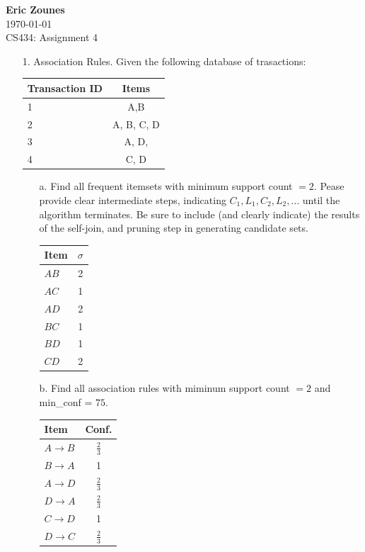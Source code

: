 \documentclass[12pt,letterpaper]{article}
\begin{document}
\setcounter{subsection}{2} 
\begin{flushright}
\end{flushright}
\begin{flushleft}
\textbf{Eric Zounes} \\
\today \\ 
CS434: Assignment 4
\end{flushleft}

\begin{enumerate} 
	\item[1.] Association Rules. Given the following database of trasactions: \\
	\begin{center}
	\begin{tabular}{| l | c |}   
		\hline
		Transaction ID & Items \\ \hline
		1 & A,B  \\ \hline
		2 & A, B, C, D  \\ \hline
		3 & A, D, \\ \hline
		4 & C, D \\ \hline 
	\end{tabular} 
	\end{center} 
	\begin{enumerate} 
		\item[a.] Find all frequent itemsets with minimum support count $= 2$. Pease provide clear intermediate steps, indicating $C_{1},L_{1},C_{2},L_{2}, \ldots$ until the algorithm terminates. Be sure to include (and clearly indicate) the results of the self-join, and pruning step in generating candidate sets. \\
	
		\begin{tabular}{| l | c |}   
		\hline
		Item & $\sigma$ \\ \hline
	   \cellcolor{green}$A B$ & 2  \\ \hline
		$A C$ & 1  \\ \hline
		\cellcolor{green}$A D$ & 2 \\ \hline
		$B C$ & 1 \\ \hline 
		$B D$ & 1 \\ \hline 
		\cellcolor{green}$C D$ & 2 \\ \hline 
		\end{tabular} 	
		
		\item[b.] Find all association rules with miminum support count $= 2$ and min\_conf = $75$.  \\
		\begin{tabular}{| l | c |}   
		\hline
		Item & Conf. \\ \hline
		$A \rightarrow B$ & $\frac{2}{3}$  \\ \hline
		\cellcolor{green}$B \rightarrow A$ & 1  \\ \hline
		$A \rightarrow D$ & $\frac{2}{3}$ \\ \hline
		$D \rightarrow A$ & $\frac{2}{3}$ \\ \hline 
		\cellcolor{green}$C \rightarrow D$ & 1 \\ \hline 
		$D \rightarrow C$ & $\frac{2}{3}$ \\ \hline 
		\end{tabular} 	
				

\end{enumerate}
\end{enumerate}
\end{document}
